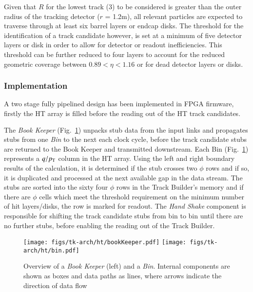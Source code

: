 Given that $R$ for the lowest \pT track (3\GeV) to be considered is greater than the outer radius of the tracking detector ($r$ = 1.2m), all relevant particles are expected to traverse through at least six barrel layers or endcap disks. The threshold for the identification of a track candidate however, is set at a minimum of five detector layers or disk in order to allow for detector or readout inefficiencies. This threshold can be further reduced to four layers to account for the reduced geometric coverage between $0.89 < \eta < 1.16$ or for dead detector layers or disks.

\subsubsection{Implementation}
A two stage fully pipelined design has been implemented in FPGA firmware, firstly the HT array is filled before the reading out of the HT track candidates. 

The \textit{Book Keeper} (Fig.~\ref{fig:implementationHT}) unpacks stub data from the input links and propagates stubs from one \textit{Bin} to the next each clock cycle, before the track candidate stubs are returned to the Book Keeper and transmitted downstream. Each Bin (Fig.~\ref{fig:implementationHT}) represents a $q/p_{\mathrm{T}}$ column in the HT array. Using the left and right boundary results of the \HT calculation, it is determined if the stub crosses two $\phi$ rows and if so, it is duplicated and processed at the next available gap in the data stream. The stubs are sorted into the sixty four $\phi$ rows in the Track Builder's memory and if there are $\phi$ cells which meet the threshold requirement on the minimum number of hit layers/disks, the row is marked for readout. The \textit{Hand Shake} component is responsible for shifting the track candidate stubs from bin to bin until there are no further stubs, before enabling the reading out of the Track Builder.

\begin{figure}[!t]
\centering
\texttt{[image: figs/tk-arch/ht/bookKeeper.pdf]}
\texttt{[image: figs/tk-arch/ht/bin.pdf]}
\caption{Overview of a \textit{Book Keeper} (left) and a \textit{Bin}. Internal components are shown as boxes and data paths as lines, where arrows indicate the direction of data flow}
\label{fig:implementationHT}
\end{figure}

